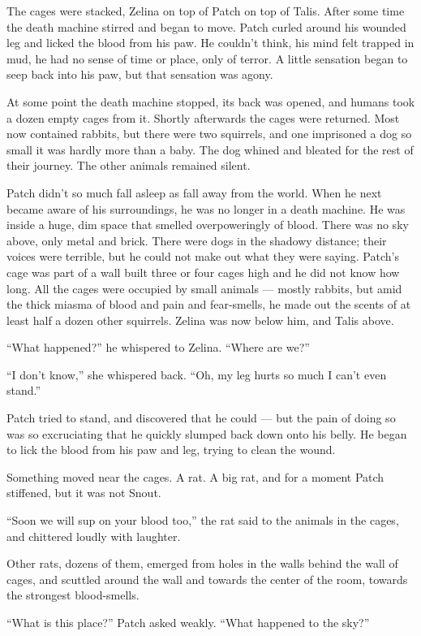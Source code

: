 \documentclass[ebook,oneside,openany,12pt]{memoir}
\begin{document}
The cages were stacked, Zelina on top of Patch on top of Talis. After
some time the death machine stirred and began to move. Patch curled
around his wounded leg and licked the blood from his paw. He couldn’t
think, his mind felt trapped in mud, he had no sense of time or place,
only of terror. A little sensation began to seep back into his paw,
but that sensation was agony.

At some point the death machine stopped, its back was opened, and
humans took a dozen empty cages from it. Shortly afterwards the cages
were returned. Most now contained rabbits, but there were two
squirrels, and one imprisoned a dog so small it was hardly more than a
baby. The dog whined and bleated for the rest of their journey. The
other animals remained silent.

Patch didn’t so much fall asleep as fall away from the world. When he
next became aware of his surroundings, he was no longer in a death
machine. He was inside a huge, dim space that smelled overpoweringly
of blood. There was no sky above, only metal and brick. There were
dogs in the shadowy distance; their voices were terrible, but he could
not make out what they were saying. Patch’s cage was part of a wall
built three or four cages high and he did not know how long. All the
cages were occupied by small animals — mostly rabbits, but amid the
thick miasma of blood and pain and fear-smells, he made out the scents
of at least half a dozen other squirrels. Zelina was now below him,
and Talis above.

“What happened?” he whispered to Zelina. “Where are we?”

“I don’t know,” she whispered back. “Oh, my leg hurts so much I can’t
even stand.”

Patch tried to stand, and discovered that he could — but the pain of
doing so was so excruciating that he quickly slumped back down onto
his belly. He began to lick the blood from his paw and leg, trying to
clean the wound.

Something moved near the cages. A rat. A big rat, and for a moment
Patch stiffened, but it was not Snout.

“Soon we will sup on your blood too,” the rat said to the animals in
the cages, and chittered loudly with laughter.

Other rats, dozens of them, emerged from holes in the walls behind the
wall of cages, and scuttled around the wall and towards the center of
the room, towards the strongest blood-smells.

“What is this place?” Patch asked weakly. “What happened to the sky?”
\end{document}
